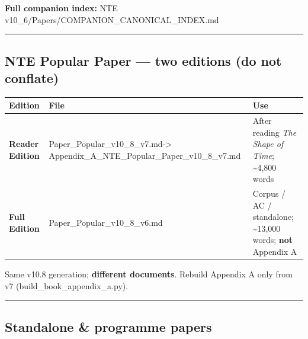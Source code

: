 \documentclass[
  11pt,
]{article}
\newcounter{none} %
\begin{document}
\textbf{Full companion index:} NTE
v10\_6/Papers/COMPANION\_CANONICAL\_INDEX.md

\begin{center}\rule{0.5\linewidth}{0.5pt}\end{center}

\subsection{NTE Popular Paper --- two editions (do not
conflate)}\label{nte-popular-paper-two-editions-do-not-conflate}

{\def\LTcaptype{none} %
\begin{longtable}[]{@{}
  >{\raggedright\arraybackslash}p{}
  >{\raggedright\arraybackslash}p{}
  >{\raggedright\arraybackslash}p{}@{}}
\toprule\noalign{}
\begin{minipage}[b]{\linewidth}\raggedright
Edition
\end{minipage} & \begin{minipage}[b]{\linewidth}\raggedright
File
\end{minipage} & \begin{minipage}[b]{\linewidth}\raggedright
Use
\end{minipage} \\
\midrule\noalign{}
\endhead
\bottomrule\noalign{}
\endlastfoot
\textbf{Reader Edition} &
Paper\_Popular\_v10\_8\_v7.md\newline -\textgreater{}
Appendix\_A\_NTE\_Popular\_Paper\_v10\_8\_v7.md & After reading
\emph{The Shape of Time}; \textasciitilde4,800 words \\
\textbf{Full Edition} & Paper\_Popular\_v10\_8\_v6.md & Corpus / AC /
standalone; \textasciitilde13,000 words; \textbf{not} Appendix A \\
\end{longtable}
}

Same v10.8 generation; \textbf{different documents}. Rebuild Appendix A
only from v7 (build\_book\_appendix\_a.py).

\begin{center}\rule{0.5\linewidth}{0.5pt}\end{center}

\subsection{Standalone \& programme
papers}\label{standalone-programme-papers}
\end{document}
